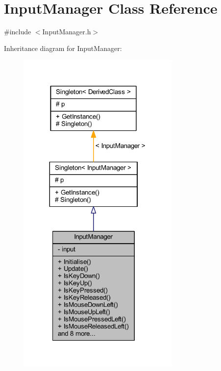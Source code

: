 \hypertarget{class_input_manager}{}\section{Input\+Manager Class Reference}
\label{class_input_manager}


{\ttfamily \#include $<$Input\+Manager.\+h$>$}



Inheritance diagram for Input\+Manager\+:\nopagebreak
\begin{figure}[H]
\begin{center}
\leavevmode
\includegraphics[width=227pt]{class_input_manager__inherit__graph}
\end{center}
\end{figure}



